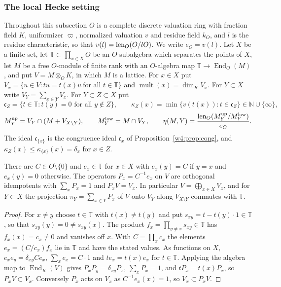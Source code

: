 \subsubsection*{The local Hecke setting}

Throughout this subsection $O$ is a complete discrete valuation ring with fraction field $K$, uniformizer $\varpi$, normalized valuation $v$ and residue field $k_O$, and $l$ is the residue characteristic, so that $v(l)=\operatorname{len}_O(O/lO)$. We write $e_O=v(l)$. Let $X$ be a finite set, let $\mathbb T\subset\prod_{x\in X}O$ be an $O$-subalgebra which separates the points of $X$, let $M$ be a free $O$-module of finite rank with an $O$-algebra map $\mathbb T\to\operatorname{End}_O(M)$, and put $V=M\otimes_OK$, in which $M$ is a lattice. For $x\in X$ put $V_x=\{u\in V:tu=t(x)u\ \text{for all }t\in\mathbb T\}$ and $\operatorname{mult}(x)=\dim_KV_x$. For $Y\subset X$ write $V_Y=\sum_{x\in Y}V_x$. For $Y\subset Z\subset X$ put
\[
\mathfrak c_Z=\{t\in\mathbb T:t(y)=0\text{ for all }y\notin Z\},\qquad \kappa_Z(x)=\min\{v(t(x)):t\in\mathfrak c_Z\}\in\mathbb N\cup\{\infty\},
\]
\[
M^{\rm up}_Y=V_Y\cap(M+V_{X\setminus Y}),\qquad M^{\rm low}_Y=M\cap V_Y,\qquad \eta(M,Y)=\frac{\operatorname{len}_O(M^{\rm up}_Y/M^{\rm low}_Y)}{e_O}.
\]
The ideal $\mathfrak c_{\{x\}}$ is the congruence ideal $\mathfrak c_x$ of Proposition~\ref{w4:prop:cong}, and $\kappa_Z(x)\le\kappa_{\{x\}}(x)=\delta_x$ for $x\in Z$.

\begin{lemma}\label{lk:lem:split}
There are $C\in O\setminus\{0\}$ and $e_x\in\mathbb T$ for $x\in X$ with $e_x(y)=C$ if $y=x$ and $e_x(y)=0$ otherwise. The operators $P_x=C^{-1}e_x$ on $V$ are orthogonal idempotents with $\sum_xP_x=1$ and $P_xV=V_x$. In particular $V=\bigoplus_{x\in X}V_x$, and for $Y\subset X$ the projection $\pi_Y=\sum_{x\in Y}P_x$ of $V$ onto $V_Y$ along $V_{X\setminus Y}$ commutes with $\mathbb T$.
\end{lemma}

\begin{proof}
For $x\ne y$ choose $t\in\mathbb T$ with $t(x)\ne t(y)$ and put $s_{xy}=t-t(y)\cdot1\in\mathbb T$, so that $s_{xy}(y)=0\ne s_{xy}(x)$. The product $f_x=\prod_{y\ne x}s_{xy}\in\mathbb T$ has $f_x(x)=c_x\ne0$ and vanishes off $x$. With $C=\prod_xc_x$ the elements $e_x=(C/c_x)f_x$ lie in $\mathbb T$ and have the stated values. As functions on $X$, $e_xe_y=\delta_{xy}Ce_x$, $\sum_xe_x=C\cdot1$ and $te_x=t(x)e_x$ for $t\in\mathbb T$. Applying the algebra map to $\operatorname{End}_K(V)$ gives $P_xP_y=\delta_{xy}P_x$, $\sum_xP_x=1$, and $tP_x=t(x)P_x$, so $P_xV\subset V_x$. Conversely $P_x$ acts on $V_x$ as $C^{-1}e_x(x)=1$, so $V_x\subset P_xV$.
\end{proof}

